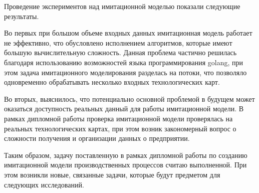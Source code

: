 Проведение экспериментов над имитационной моделью показали следующие результаты.

Во первых при большом объеме входных данных имитационная модель работает не эффективно, что обусловлено исполнением алгоритмов, которые имеют большую вычислительную сложность.
Данная проблема частично решилась благодаря использованию возможностей языка программирования golang, при этом задача имитационного моделирования разделась на потоки, что позволяло одновременно обрабатывать несколько входных технологических карт.

Во вторых, выяснилось, что потенциально основной проблемой в будущем может оказаться доступность реальных данный для работы имитационной модели.
В рамках дипломной работы проверка имитационной модели проверялась на реальных технологических картах, при этом возник закономерный вопрос о сложности получения и организации данных о предприятии. 

Таким образом, задачу поставленную в рамках дипломной работы по созданию имитационной модели производственных процессов считаю выполненной. 
При этом возникли новые, связанные задачи, которые будут предметом для следующих исследований.